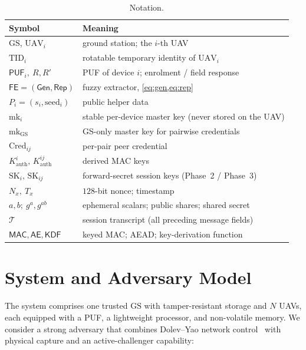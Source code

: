 \documentclass[11pt,a4paper]{article}
\theoremstyle{jrnlplain}
\theoremstyle{jrnldef}
\newcommand{\GS}{\mathrm{GS}}
\newcommand{\UAV}{\mathrm{UAV}}
\newcommand{\PUF}{\mathsf{PUF}}
\newcommand{\TID}{\mathrm{TID}}
\newcommand{\Cred}{\mathrm{Cred}}
\newcommand{\mk}{\mathrm{mk}}
\newcommand{\SK}{\mathrm{SK}}
\newcommand{\MAC}{\mathsf{MAC}}
\newcommand{\aead}{\mathsf{AE}}
\newcommand{\KDF}{\mathsf{KDF}}
\newcommand{\Gen}{\mathsf{Gen}}
\newcommand{\Rep}{\mathsf{Rep}}
\newcommand{\FE}{\mathsf{FE}}
\newcommand{\transcript}{\mathcal{T}}
\begin{document}
\medskip
\begin{table}[t]
\centering
\caption{Notation.}
\label{tab:notation}
\renewcommand{\arraystretch}{1.25}
\begin{tabularx}{\linewidth}{@{}l X@{}}
\toprule
\textbf{Symbol} & \textbf{Meaning}\\
\midrule
$\GS$, $\UAV_i$ & ground station; the $i$-th UAV\\
$\TID_i$ & rotatable temporary identity of $\UAV_i$\\
$\PUF_i,\ R,R'$ & PUF of device $i$; enrolment / field response\\
$\FE=(\Gen,\Rep)$ & fuzzy extractor, \cref{eq:gen,eq:rep}\\
$P_i=(s_i,\mathrm{seed}_i)$ & public helper data\\
$\mk_i$ & stable per-device master key (never stored on the UAV)\\
$\mk_{\GS}$ & GS-only master key for pairwise credentials\\
$\Cred_{ij}$ & per-pair peer credential\\
$K^{i}_{\mathrm{auth}},\,K^{ij}_{\mathrm{auth}}$ & derived MAC keys\\
$\SK_i,\,\SK_{ij}$ & forward-secret session keys (Phase~2 / Phase~3)\\
$N_x,\ T_x$ & $128$-bit nonce; timestamp\\
$a,b;\ g^{a},g^{ab}$ & ephemeral scalars; public shares; shared secret\\
$\transcript$ & session transcript (all preceding message fields)\\
$\MAC,\aead,\KDF$ & keyed MAC; AEAD; key-derivation function\\
\bottomrule
\end{tabularx}
\end{table}

\section{System and Adversary Model}
\label{sec:model}
The system comprises one trusted $\GS$ with tamper-resistant storage and $N$
UAVs, each equipped with a PUF, a lightweight processor, and non-volatile
memory. We consider a strong adversary that combines Dolev--Yao network
control~\cite{dolevyao1983} with physical capture and an active-challenger
capability:
\end{document}
